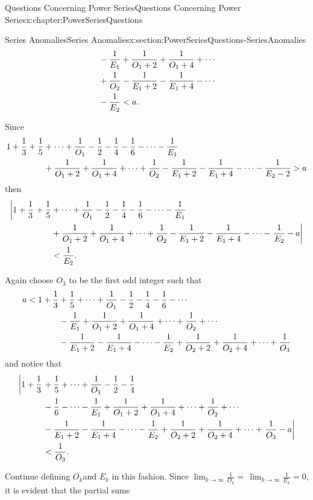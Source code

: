 \begin{chapterptx}{Questions Concerning Power Series}{}{Questions Concerning Power Series}{}{}{x:chapter:PowerSeriesQuestions}
\begin{sectionptx}{Series Anomalies}{}{Series Anomalies}{}{}{x:section:PowerSeriesQuestions-SeriesAnomalies}
\begin{align*}
			& -\frac{1}{E_1}+ \frac{1}{O_1+2}+\frac{1}{O_1+4}+\cdots\\
			& +\frac{1}{O_2}-\frac{1}{E_1+2}-\frac{1}{E_1+4}-\cdots\\
			& -\frac{1}{E_2}< a\text{.}
		\end{align*}
		\par
		Since%
		\begin{align*}
			1+\frac{1}{3}+\frac{1}{5}& +\cdots+\frac{1}{O_1}-\frac{1}{2}- \frac{1}{4}-\frac{1}{6}-\cdots-\frac{1}{E_1}\\
			& +\frac{1}{O_1+2}+\frac{1}{O_1+4}+\cdots+\frac{1}{O_2}- \frac{1}{E_1+2}-\frac{1}{E_1+4}-\cdots-\frac{1}{E_2-2}>a
		\end{align*}
		then%
		\begin{align*}
			\left|1+\frac{1}{3}\right.+\frac{1}{5}& +\cdots+\frac{1}{O_1}-\frac{1}{2}- \frac{1}{4}-\frac{1}{6}-\cdots-\frac{1}{E_1}\\
			& +\frac{1}{O_1+2}+\frac{1}{O_1+4}+\cdots+\frac{1}{O_2}- \frac{1}{E_1+2}-\frac{1}{E_1+4}-\cdots-\left.\frac{1}{E_2}-a\right|\\
			& < \frac{1}{E_2}\text{.}
		\end{align*}
		\par
		Again choose \(O_3\) to be the first odd integer such that%
		\begin{align*}
			a< 1+\frac{1}{3}& +\frac{1}{5}+\cdots+\frac{1}{O_1}-\frac{1}{2}-\frac{1}{4}- \frac{1}{6}-\cdots\\
			& -\frac{1}{E_1}+\frac{1}{O_1+2}+\frac{1}{O_1+4}+\cdots+ \frac{1}{O_2}+ \cdots\\
			& -\frac{1}{E_1+2}-\frac{1}{E_1+4}-\cdots-\frac{1}{E_2}+\frac{1}{O_2+2}+ \frac{1}{O_2+4}+\cdots+\frac{1}{O_3}
		\end{align*}
		and notice that%
		\begin{align*}
			\left|1+\frac{1}{3}\right.& +\frac{1}{5}+\cdots+\frac{1}{O_1}-\frac{1}{2}-\frac{1}{4}\\
			& -\frac{1}{6}-\cdots-\frac{1}{E_1}+\frac{1}{O_1+2}+\frac{1}{O_1+4}+\cdots+ \frac{1}{O_2}+\cdots\\
			& -\frac{1}{E_1+2}-\frac{1}{E_1+4}-\cdots-\frac{1}{E_2}+\frac{1}{O_2+2}+ \frac{1}{O_2+4}+\cdots+\left.\frac{1}{O_3}-a\right|\\
			& < \frac{1}{O_3}\text{.}
		\end{align*}
		\par
		Continue defining \(O_k\)and \(E_k\) in this fashion. Since \(\lim_{k\rightarrow\infty}\frac{1}{O_k}=\,\lim_{k\rightarrow\infty} \frac{1}{E_k}=0\), it is evident that the partial sums%

\end{sectionptx}
\end{chapterptx}
